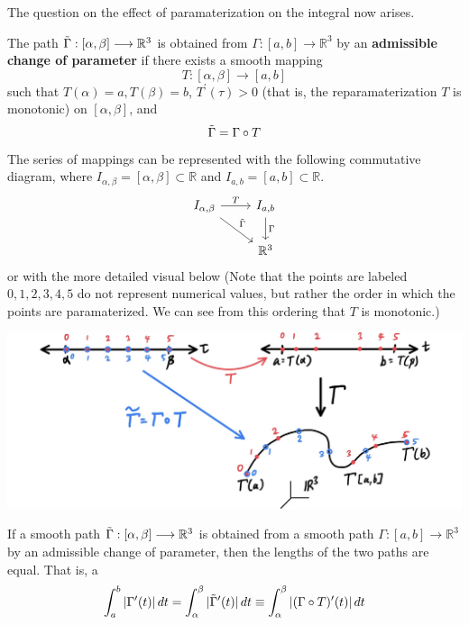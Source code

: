     The question on the effect of paramaterization on the integral now arises. 

    \begin{definition}
      The path $\Tilde{\Gamma}: [\alpha, \beta] \longrightarrow \mathbb{R}^3$ is obtained from $\Gamma: [a, b] \longrightarrow \mathbb{R}^3$ by an \textbf{admissible change of parameter} if there exists a smooth mapping 
      \[T: [\alpha, \beta] \longrightarrow [a, b]\]
      such that $T(\alpha) = a, T(\beta) = b$, $T^\prime (\tau) > 0$ (that is, the reparamaterization $T$ is monotonic) on $[\alpha, \beta]$, and 
      \[\Tilde{\Gamma} = \Gamma \circ T\]
      The series of mappings can be represented with the following commutative diagram, where $I_{\alpha, \beta} = [\alpha, \beta] \subset \mathbb{R}$ and $I_{a, b} = [a, b] \subset \mathbb{R}$. 
      \[
        \begin{tikzcd}
          I_{\alpha, \beta} \arrow{r}{T} \arrow{rd}{\Tilde{\Gamma}}& I_{a, b} \arrow{d}{\Gamma}\\
           & \mathbb{R}^3
        \end{tikzcd}
      \]
      or with the more detailed visual below (Note that the points are labeled $0, 1, 2, 3, 4, 5$ do not represent numerical values, but rather the order in which the points are paramaterized. We can see from this ordering that $T$ is monotonic.)
      \begin{center}
          \includegraphics[scale=0.25]{img/Admissible_Change_of_Parameter.jpg}
      \end{center}
    \end{definition}

    \begin{theorem}
    If a smooth path $\Tilde{\Gamma}: [\alpha, \beta] \longrightarrow \mathbb{R}^3$ is obtained from a smooth path $\Gamma: [a, b] \longrightarrow \mathbb{R}^3$ by an admissible change of parameter, then the lengths of the two paths are equal. That is, a
    \[\int_a^b |\Gamma^\prime (t) |\,dt = \int_\alpha^\beta |\Tilde{\Gamma}^\prime (t)|\,dt \equiv \int_\alpha^\beta |(\Gamma \circ T)^\prime (t)|\,dt\]
    \end{theorem}

